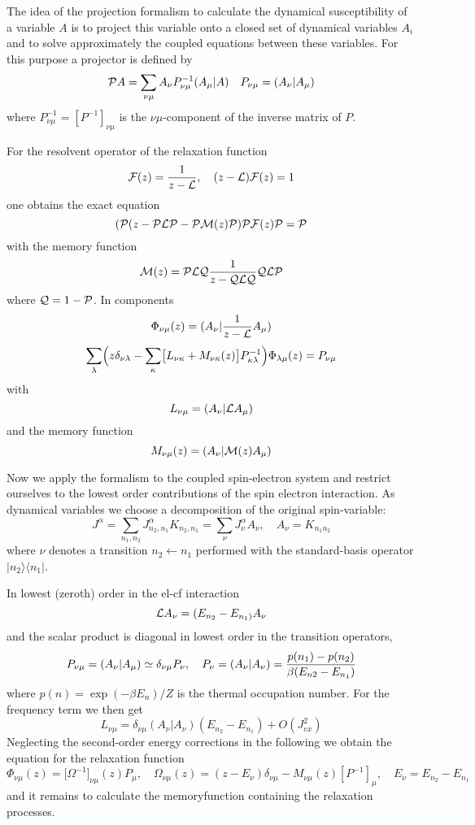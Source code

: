 The idea of the projection formalism to calculate the dynamical
susceptibility of a variable $A$ is to project this variable  onto a closed
set of dynamical variables $A_i$ and to solve approximately the coupled
equations between these variables. For this purpose a projector is defined
by
$$
{\cal P} A= \sum_{\nu \mu}A_\nu P^{-1}_{\nu \mu}(A_\mu\vert A) \quad
P_{\nu\mu}=(A_\nu\vert A_\mu)
$$ 
where $ P^{-1}_{\nu \mu}=[P^{-1}]_{\nu \mu}$ is the ${\nu\mu}$-component of the inverse matrix of
$P$. 

For the  resolvent operator of the relaxation function
$$
{\cal F}(z)= {1\over {z-\cal L}}, \quad ({z-\cal L}){\cal F}(z)=1 
$$
one obtains the exact equation
$$
({\cal P}(z-{\cal P}{\cal L}{\cal P} - {\cal P} {\cal M}(z) {\cal P}){\cal P} {\cal
F}(z) {\cal P}= {\cal P}
$$
with the memory function
$$
{\cal M}(z)={\cal PLQ}{1\over z-{\cal QLQ} }{\cal QLP}
$$ 
where ${\cal Q}=1-{\cal P}$. In components
$$
\Phi_{\nu\mu}(z)= (A_\nu\vert {1\over z-{\cal L}} A_\mu)
$$
$$
\sum_\lambda \Bigl(z\delta_{\nu\lambda}-\sum_\kappa\bigl[L_{\nu\kappa}+
M_{\nu\kappa}(z)\bigr]P^{-1}_{\kappa\lambda}\Bigr)\Phi_{\lambda\mu}(z)
=P_{\nu \mu}
$$
with
$$
L_{\nu\mu}=(A_\nu\vert {\cal L}A_\mu)
$$
and the memory function 
$$
M_{\nu\mu}(z)=(A_\nu\vert{\cal M}(z)A_\mu)
$$

Now we apply the formalism to the coupled spin-electron system and restrict
ourselves to the lowest order contributions of the spin electron
interaction. As dynamical variables we choose a decomposition of the  
original spin-variable:
$$
J^\alpha=\sum_{n_1,n_2}J^\alpha_{n_2,n_1}K_{n_2,n_1}=\sum_\nu J^\alpha_\nu A_\nu, 
\quad 
A_\nu= K_{n_1n_2}   
$$
where $\nu$ denotes a transition $n_2 \gets n_1$ performed with the
standard-basis operator $\vert n_2\rangle\langle n_1\vert$. 

In lowest (zeroth) order in the el-cf interaction  
$$
{\cal L}A_\nu = (E_{n_2}-E_{n_1)}A_\nu
$$
and  the scalar product is diagonal in lowest order in the transition
operators,
$$
P_{\nu\mu}=(A_\nu\vert A_\mu)\simeq\delta_{\nu
\mu}P_\nu, \quad P_\nu=(A_\nu\vert
A_\nu)={p(n_1)-p(n_2)\over \beta (E_{n2}-E_{n_1})}
$$
where $p(n)=\exp(-\beta E_n)/Z$ is the thermal occupation number. For the
frequency term we then get 
$$
L_{\nu\mu}=\delta_{\nu\mu}(A_\nu\vert A_\nu) (E_{n_2}-E_{n_1} )
+O(J_{ex}^2)
$$
Neglecting the second-order energy corrections in the following we obtain
the equation for the relaxation function 
$$
\Phi_{\nu\mu}(z)=\bigl[\Omega^{-1}\bigr]_{\nu\mu}(z)
P_\mu, \quad
\Omega_{\nu\mu}(z)=(z-E_\nu)\delta_{\nu\mu} -
M_{\nu\mu}(z)[P^{-1}]_\mu, \quad
E_\nu = E_{n_2}- E_{n_1}
$$
and it remains to calculate the memoryfunction containing the relaxation
processes. 

